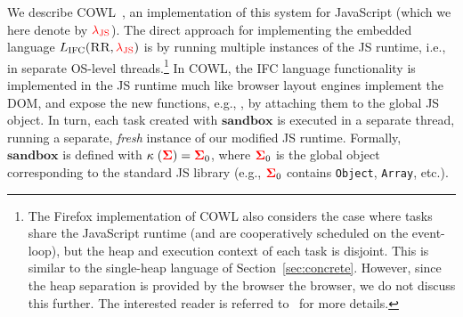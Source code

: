 \documentclass{sigplanconf}
\newcommand{\Red}[1]{{\color{red} #1}}
\begin{document}
We describe COWL~\cite{swapi}, an implementation of this system for JavaScript
(which we here denote by \ensuremath{\Red{\lambda_{\text{JS}}}}).
%
The direct approach for implementing the embedded language \ensuremath{L_\text{IFC}(\textsc{RR},\Red{\lambda_{\text{JS}}})} is
by running multiple instances of the JS runtime, i.e., in
separate OS-level threads.\footnote{
 The Firefox implementation of COWL also considers the case where
 tasks share the JavaScript runtime (and are cooperatively scheduled
 on the event-loop), but the heap and execution context of each task
 is disjoint. This is similar to the single-heap language of
 Section~\ref{sec:concrete}.  However, since the heap separation is
 provided by the browser the browser, we do not discuss this further.
 The interested reader is referred to~\cite{swapi} for more details.
}
%
In COWL, the IFC language functionality is implemented in the JS
runtime much like browser layout engines implement the DOM, and expose
the new functions, e.g., , by attaching them to
the global JS object.
%
In turn, each task created with \ensuremath{\mathbf{sandbox}} is
executed in a separate thread, running a separate, \emph{fresh} instance of our
modified JS runtime.
%
Formally, \ensuremath{\mathbf{sandbox}} is defined with \ensuremath{\kappa\;(\tar{\Sigma})\mathrel{=}\tar{\Sigma}_{0}}, where \ensuremath{\tar{\Sigma}_{0}} is the global object corresponding to the standard
JS library (e.g., \ensuremath{\tar{\Sigma}_{0}} contains \texttt{Object}, \texttt{Array},
etc.).
\end{document}
